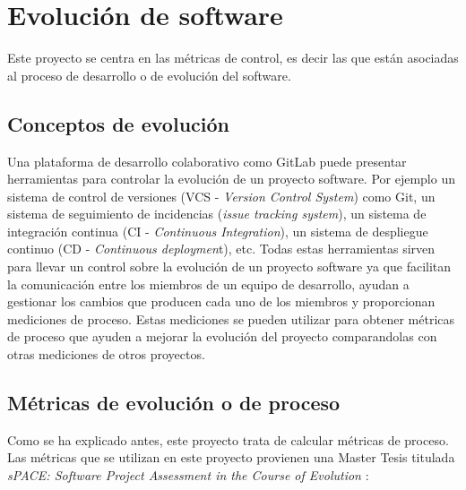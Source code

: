 \section{Evolución de software}
Este proyecto se centra en las métricas de control, es decir las que están asociadas al proceso de desarrollo o de evolución del software.
\subsection{Conceptos de evolución}
Una plataforma de desarrollo colaborativo como GitLab puede presentar herramientas para controlar la evolución de un proyecto software. Por ejemplo un sistema de control de versiones (VCS - \textit{Version Control System}) como Git, un sistema de seguimiento de incidencias (\textit{issue tracking system}), un sistema de integración continua (CI - \textit{Continuous Integration}), un sistema de despliegue continuo (CD - \textit{Continuous deploymen}t), etc.
Todas estas herramientas sirven para llevar un control sobre la evolución de un proyecto software ya que facilitan la comunicación entre los miembros de un equipo de desarrollo, ayudan a gestionar los cambios que producen cada uno de los miembros y proporcionan mediciones de proceso. Estas mediciones se pueden utilizar para obtener métricas de proceso que ayuden a mejorar la evolución del proyecto comparandolas con otras mediciones de otros proyectos.

\subsection{Métricas de evolución o de proceso}
Como se ha explicado antes, este proyecto trata de calcular métricas de proceso. Las métricas que se utilizan en este proyecto provienen una Master Tesis titulada \textit{sPACE: Software Project Assessment in the Course of Evolution} \cite{ratzinger_space:_2007}:\\

